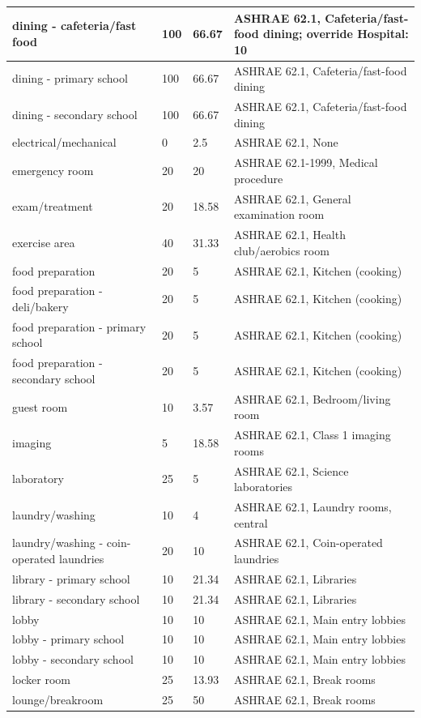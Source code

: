 \begin{center}
\begin{longtable}{|p{2.1in}|p{0.85in}|p{0.85in}|p{2.5in}|}
dining - cafeteria/fast food & 100 & 66.67 & ASHRAE 62.1, Cafeteria/fast-food dining; override Hospital: 10 \\ \hline
dining - primary school & 100 & 66.67 & ASHRAE 62.1, Cafeteria/fast-food dining \\ \hline
dining - secondary school & 100 & 66.67 & ASHRAE 62.1, Cafeteria/fast-food dining \\ \hline
electrical/mechanical & 0 & 2.5 & ASHRAE 62.1, None \\ \hline
emergency room & 20 & 20 & ASHRAE 62.1-1999, Medical procedure \\ \hline
exam/treatment & 20 & 18.58 & ASHRAE 62.1, General examination room \\ \hline
exercise area & 40 & 31.33 & ASHRAE 62.1, Health club/aerobics room \\ \hline
food preparation & 20 & 5 & ASHRAE 62.1, Kitchen (cooking) \\ \hline
food preparation - deli/bakery & 20 & 5 & ASHRAE 62.1, Kitchen (cooking) \\ \hline
food preparation - primary school & 20 & 5 & ASHRAE 62.1, Kitchen (cooking) \\ \hline
food preparation - secondary school & 20 & 5 & ASHRAE 62.1, Kitchen (cooking) \\ \hline
guest room & 10 & 3.57 & ASHRAE 62.1, Bedroom/living room \\ \hline
imaging & 5 & 18.58 & ASHRAE 62.1, Class 1 imaging rooms \\ \hline
laboratory & 25 & 5 & ASHRAE 62.1, Science laboratories \\ \hline
laundry/washing & 10 & 4 & ASHRAE 62.1, Laundry rooms, central \\ \hline
laundry/washing - coin-operated laundries & 20 & 10 & ASHRAE 62.1, Coin-operated laundries \\ \hline
library - primary school & 10 & 21.34 & ASHRAE 62.1, Libraries \\ \hline
library - secondary school & 10 & 21.34 & ASHRAE 62.1, Libraries \\ \hline
lobby & 10 & 10 & ASHRAE 62.1, Main entry lobbies \\ \hline
lobby - primary school & 10 & 10 & ASHRAE 62.1, Main entry lobbies \\ \hline
lobby - secondary school & 10 & 10 & ASHRAE 62.1, Main entry lobbies \\ \hline
locker room & 25 & 13.93 & ASHRAE 62.1, Break rooms \\ \hline
lounge/breakroom & 25 & 50 & ASHRAE 62.1, Break rooms \\ \hline

\end{longtable}
\end{center}

